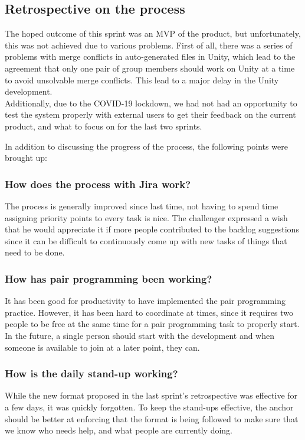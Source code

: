 \subsection{Retrospective on the process}
The hoped outcome of this sprint was an MVP of the product, but unfortunately, this was not achieved due to various problems.
First of all, there was a series of problems with merge conflicts in auto-generated files in Unity, which lead to the agreement that only one pair of group members should work on Unity at a time to avoid unsolvable merge conflicts.
This lead to a major delay in the Unity development.\\
Additionally, due to the COVID-19 lockdown, we had not had an opportunity to test the system properly with external users to get their feedback on the current product, and what to focus on for the last two sprints.

In addition to discussing the progress of the process, the following points were brought up:

\subsubsection*{How does the process with Jira work?}
The process is generally improved since last time, not having to spend time assigning priority points to every task is nice.
The challenger expressed a wish that he would appreciate it if more people contributed to the backlog suggestions since it can be difficult to continuously come up with new tasks of things that need to be done.


\subsubsection*{How has pair programming been working?}
It has been good for productivity to have implemented the pair programming practice.
However, it has been hard to coordinate at times, since it requires two people to be free at the same time for a pair programming task to properly start.
In the future, a single person should start with the development and when someone is available to join at a later point, they can.

\subsubsection*{How is the daily stand-up working?}
While the new format proposed in the last sprint's retrospective was effective for a few days, it was quickly forgotten.
To keep the stand-ups effective, the anchor should be better at enforcing that the format is being followed to make sure that we know who needs help, and what people are currently doing.

